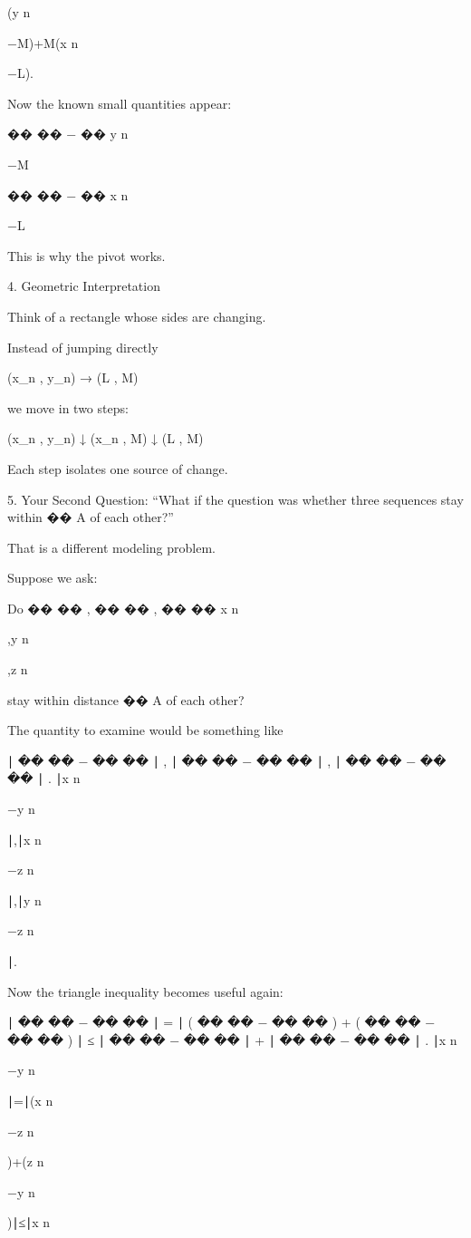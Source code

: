 (y
n
	​

−M)+M(x
n
	​

−L).

Now the known small quantities appear:

��
��
−
��
y
n
	​

−M

��
��
−
��
x
n
	​

−L

This is why the pivot works.

4. Geometric Interpretation

Think of a rectangle whose sides are changing.

Instead of jumping directly

(x_n , y_n) → (L , M)

we move in two steps:

(x_n , y_n)
      ↓
(x_n , M)
      ↓
(L , M)

Each step isolates one source of change.

5. Your Second Question:
“What if the question was whether three sequences stay within 
��
A of each other?”

That is a different modeling problem.

Suppose we ask:

Do 
��
��
,
��
��
,
��
��
x
n
	​

,y
n
	​

,z
n
	​

 stay within distance 
��
A of each other?

The quantity to examine would be something like

∣
��
��
−
��
��
∣
,
∣
��
��
−
��
��
∣
,
∣
��
��
−
��
��
∣
.
∣x
n
	​

−y
n
	​

∣,∣x
n
	​

−z
n
	​

∣,∣y
n
	​

−z
n
	​

∣.

Now the triangle inequality becomes useful again:

∣
��
��
−
��
��
∣
=
∣
(
��
��
−
��
��
)
+
(
��
��
−
��
��
)
∣
≤
∣
��
��
−
��
��
∣
+
∣
��
��
−
��
��
∣
.
∣x
n
	​

−y
n
	​

∣=∣(x
n
	​

−z
n
	​

)+(z
n
	​

−y
n
	​

)∣≤∣x
n
	​

